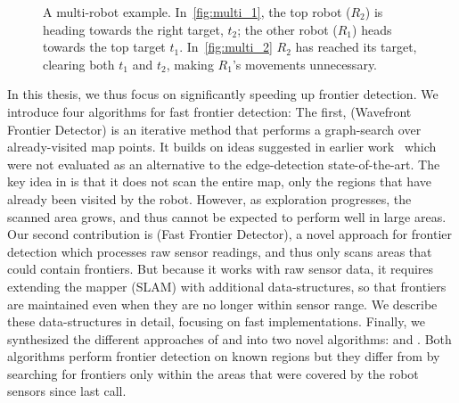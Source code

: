 \begin{figure}
 \centering
 \caption{A multi-robot example.  In~\ref{fig:multi_1}, the top robot ($R_2$) is heading towards the right target, $t_2$; the other robot ($R_1$) heads towards the top target $t_1$. In~\ref{fig:multi_2} $R_2$ has reached its target, clearing both $t_1$ and $t_2$, making $R_1$'s movements unnecessary.}
 \label{fig:mutli_example}
\end{figure}

In this thesis, we thus focus on significantly speeding up frontier detection.
We introduce four algorithms for fast frontier detection: 
The first, \WFD (Wavefront Frontier Detector) %
is an iterative method that performs a graph-search over already-visited map
points. It builds on ideas suggested in earlier
work~\cite{Calisi:2007:MES:1291068.1291076} which were not evaluated as an
alternative to the edge-detection state-of-the-art. The key idea in \WFD is
that it does not scan the entire map, only the regions that have already been
visited by the robot.
However, as exploration progresses, the scanned area grows, and thus \WFD cannot
be expected to perform well in large areas.  Our second contribution is 
\FFD (Fast Frontier Detector), %
a novel approach for frontier detection which processes raw sensor readings,
and thus only scans areas that could contain frontiers. But because it works
with raw sensor data, it requires extending the mapper (SLAM) with additional
data-structures, so that frontiers are maintained
even when they are no longer within sensor range.
We describe these data-structures in detail, focusing on 
fast implementations.
Finally, we synthesized the different approaches of
\WFD and \FFD into two novel algorithms: \WFDINC and \WFDIP. Both algorithms
perform frontier detection on known regions but they differ from \WFD by
searching for frontiers only within the areas that were covered by the robot
sensors since last call.

